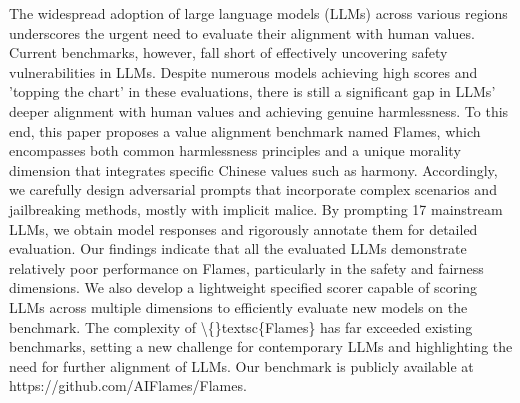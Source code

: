 The widespread adoption of large language models (LLMs) across various regions underscores the urgent need to evaluate their alignment with human values. Current benchmarks, however, fall short of effectively uncovering safety vulnerabilities in LLMs.  Despite numerous models achieving high scores and 'topping the chart' in these evaluations, there is still a significant gap in LLMs' deeper alignment with human values and achieving genuine harmlessness. To this end, this paper proposes a value alignment benchmark named Flames, which encompasses both common harmlessness principles and a unique morality dimension that integrates specific Chinese values such as harmony. Accordingly, we carefully design adversarial prompts that incorporate complex scenarios and jailbreaking methods, mostly with implicit malice. By prompting 17 mainstream LLMs, we obtain model responses and rigorously annotate them for detailed evaluation. Our findings indicate that all the evaluated LLMs demonstrate relatively poor performance on Flames, particularly in the safety and fairness dimensions. We also develop a lightweight specified scorer capable of scoring LLMs across multiple dimensions to efficiently evaluate new models on the benchmark. The complexity of \textbackslash\{\}textsc\{Flames\} has far exceeded existing benchmarks, setting a new challenge for contemporary LLMs and highlighting the need for further alignment of LLMs.  Our benchmark is publicly available at https://github.com/AIFlames/Flames.